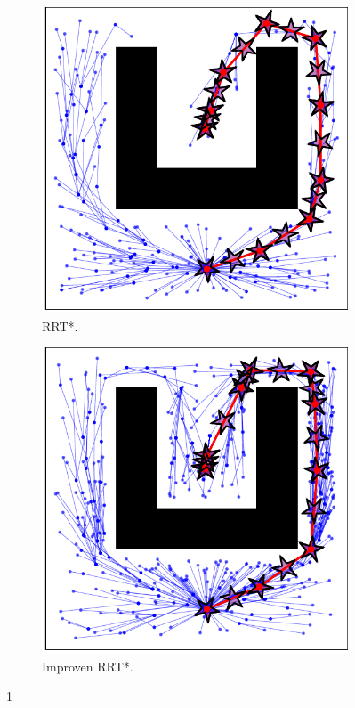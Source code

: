 \documentclass{ctuthesis}
\begin{document}
\begin{figure}[!ht]
  \centering 
  \begin{subfigure}[b]{0.45\textwidth}
      \includegraphics[width=\textwidth]{figChap4/RRTstar2D_maze241.4.pdf}
      \caption{RRT*.}
      \label{fig:rrtstar2D_maze}
  \end{subfigure}  
  \begin{subfigure}[b]{0.45\textwidth}
      \includegraphics[width=\textwidth]{figChap4/RRTstar2DML_maze237.2.pdf}
      \caption{Improven RRT*.}
      \label{fig:rrtstarML2D_maze}
  \end{subfigure}
  \caption{1}
  \label{fig:RRTstar2D_vs_RRTstarML2D}
\end{figure}
\end{document}
